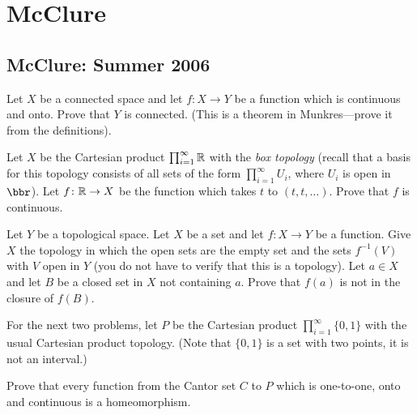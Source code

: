 \section{McClure}
\subsection{McClure: Summer 2006}
\setcounter{exercise}{0}
\setcounter{equation}{0}

\begin{problem}
  Let $X$ be a connected space and let $f\colon X\to Y$ be a function which
  is continuous and onto. Prove that $Y$ is connected. (This is a theorem
  in Munkres---prove it from the definitions).
\end{problem}
\begin{solution}
\end{solution}

\begin{problem}
  Let $X$ be the Cartesian product $\prod_{i=1}^\infty\mathbb{R}$ with the
  \emph{box topology} (recall that a basis for this topology consists of
  all sets of the form $\prod_{i=1}^\infty U_i$, where $U_i$ is open in
  $\bbr$). Let $f\colon\mathbb{R}\to X$ be the function which takes $t$ to
  $(t,t,\ldots)$. Prove that $f$ is continuous.
\end{problem}
\begin{solution}
\end{solution}

\begin{problem}
  Let $Y$ be a topological space. Let $X$ be a set and let $f\colon X\to Y$
  be a function. Give $X$ the topology in which the open sets are the empty
  set and the sets $f^{-1}(V)$ with $V$ open in $Y$ (you do not have to
  verify that this is a topology). Let $a\in X$ and let $B$ be a closed set
  in $X$ not containing $a$. Prove that $f(a)$ is not in the closure of
  $f(B)$.
\end{problem}
\begin{solution}
\end{solution}

For the next two problems, let $P$ be the Cartesian product
$\prod_{i=1}^\infty\{0,1\}$ with the usual Cartesian product
topology. (Note that $\{0,1\}$ is a set with two points, it is not an
interval.)
\begin{problem}
  Prove that every function from the Cantor set $C$ to $P$ which is
  one-to-one, onto and continuous is a homeomorphism.
\end{problem}
\begin{solution}
\end{solution}

